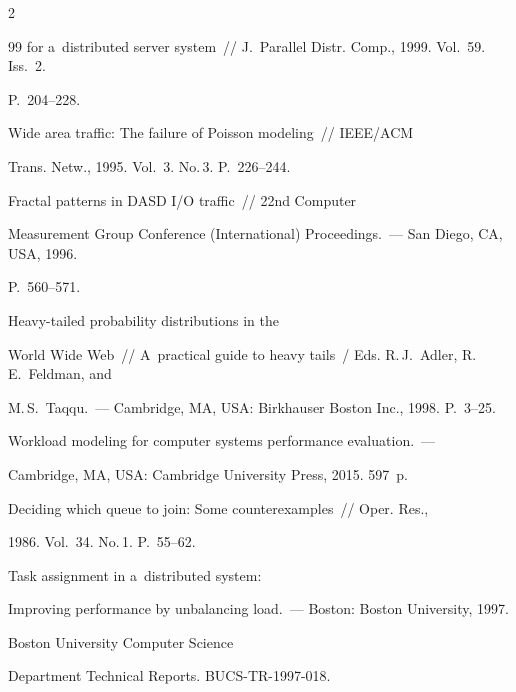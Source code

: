 \begin{multicols}{2}
{{\begin{thebibliography}{99}
for a~distributed server system~// J.~Parallel Distr. Comp., 1999. Vol.~59. Iss.~2. 


P.~204--228.




     Wide area traffic: The failure of Poisson modeling~// IEEE/ACM 


Trans. Netw., 1995. Vol.~3. No.\,3. P.~226--244.




     Fractal patterns in DASD I/O traffic~// 22nd Computer 


Measurement Group Conference (International) Proceedings.~--- San Diego, CA, USA, 1996. 


P.~560--571.




     Heavy-tailed probability distributions in the 


World Wide Web~// A~practical guide to heavy tails~/ Eds. R.\,J.~Adler, R.\,E.~Feldman, and 


M.\,S.~Taqqu.~--- Cambridge, MA, USA: Birkhauser Boston Inc., 1998. P.~3--25.


   




     Workload modeling for computer systems performance evaluation.~--- 


Cambridge, MA, USA: Cambridge University Press, 2015. 597~p.


   




     Deciding which queue to join: Some counterexamples~// Oper. Res., 


1986. Vol.~34. No.\,1. P.~55--62.




     Task assignment in a~distributed system: 


Improving performance by unbalancing load.~--- Boston: Boston University, 1997.


Boston University Computer Science 


Department Technical Reports. BUCS-TR-1997-018.





\end{thebibliography}}}
\end{multicols}
